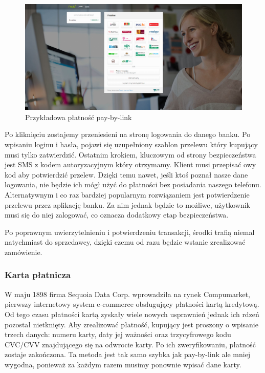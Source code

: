 \documentclass[12pt]{article}
\numberwithin{figure}{section}
\begin{document}
\begin{sloppypar}
\begin{figure}[H] 
 	\centering
	\includegraphics[width=1\textwidth]{images/chapter_2/pay-by-link.png}
	\caption{Przykładowa płatność pay-by-link}
	\label{fig:pay-by-link}
\end{figure}

Po kliknięciu zostajemy przeniesieni na stronę logowania do danego banku. Po wpisaniu loginu i hasła, pojawi się uzupełniony szablon przelewu który kupujący musi tylko zatwierdzić. Ostatnim krokiem, kluczowym od strony bezpieczeństwa jest SMS z kodem autoryzacyjnym który otrzymamy. Klient musi przepisać owy kod aby potwierdzić przelew. Dzięki temu nawet, jeśli ktoś poznał nasze dane logowania, nie będzie ich mógł użyć do płatności bez posiadania naszego telefonu. Alternatywnym i co raz bardziej popularnym rozwiązaniem jest potwierdzenie przelewu przez aplikację banku. Za nim jednak będzie to możliwe, użytkownik musi się do niej zalogować, co oznacza dodatkowy etap bezpieczeństwa.

Po poprawnym uwierzytelnieniu i potwierdzeniu transakcji, środki trafią niemal natychmiast do sprzedawcy, dzięki czemu od razu będzie wstanie zrealizować zamówienie.

\subsubsection{Karta płatnicza} \label{sec:cards}
W maju 1898 firma Sequoia Data Corp. wprowadziła na rynek Compumarket, pierwszy internetowy system e-commerce obsługujący płatności kartą kredytową. Od tego czasu płatności kartą zyskały wiele nowych usprawnień jednak ich rdzeń pozostał nietknięty. Aby zrealizować płatność, kupujący jest proszony o wpisanie trzech danych: numeru karty, daty jej ważności oraz trzycyfrowego kodu CVC/CVV znajdującego się na odwrocie karty. Po ich zweryfikowaniu, płatność zostaje zakończona. Ta metoda jest tak samo szybka jak pay-by-link ale mniej wygodna, ponieważ za każdym razem musimy ponownie wpisać dane karty. 


\end{sloppypar}
\end{document}
